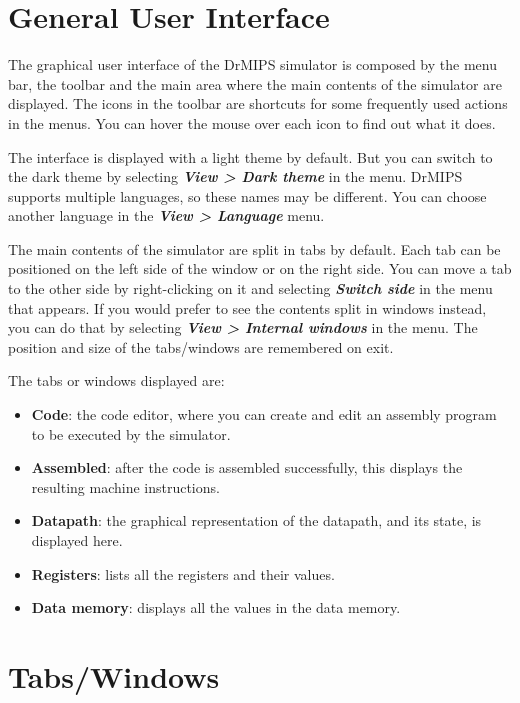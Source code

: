 \documentclass[11pt,a4paper,twoside,titlepage]{article}
\author{Bruno Nova}
\title{\Title}
\newcommand{\menupath}[1]{\textbf{\emph{#1}}}
\begin{document}
\maketitle
\tableofcontents
\newpage

\section{General User Interface}

The graphical user interface of the DrMIPS simulator is composed by the menu 
bar, the toolbar and the main area where the main contents of the simulator 
are displayed.
The icons in the toolbar are shortcuts for some frequently used actions in the
menus. You can hover the mouse over each icon to find out what it does.

The interface is displayed with a light theme by default. But you can switch
to the dark theme by selecting \menupath{View > Dark theme} in the menu.
DrMIPS supports multiple languages, so these names may be different.
You can choose another language in the \menupath{View > Language} menu.

The main contents of the simulator are split in tabs by default. Each tab can
be positioned on the left side of the window or on the right side. 
You can move a tab to the other side by right-clicking on it and selecting 
\menupath{Switch side} in the menu that appears.
If you would prefer to see the contents split in windows instead, you can do
that by selecting \menupath{View > Internal windows} in the menu.
The position and size of the tabs/windows are remembered on exit.

The tabs or windows displayed are:
\begin{itemize}
	\item \textbf{Code}: the code editor, where you can create and edit an
		assembly program to be executed by the simulator.
	\item \textbf{Assembled}: after the code is assembled successfully, this
		displays the resulting machine instructions.
	\item \textbf{Datapath}: the graphical representation of the datapath,
		and its state, is displayed here.
	\item \textbf{Registers}: lists all the registers and their values.
	\item \textbf{Data memory}: displays all the values in the data memory.
\end{itemize}


\section{Tabs/Windows}
\end{document}
